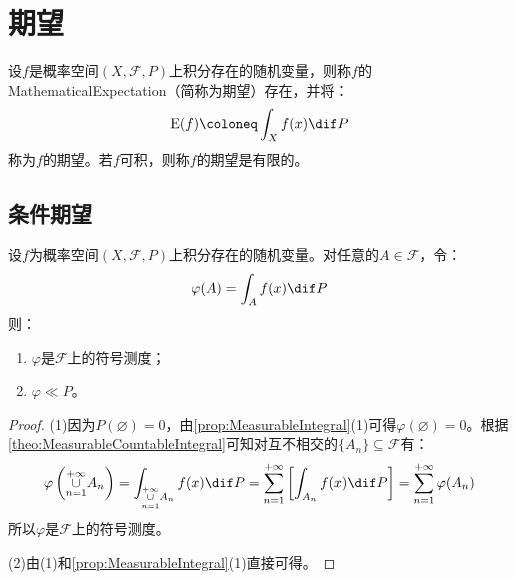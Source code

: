 \section{期望}

\begin{definition}
	设$f$是概率空间$(X,\mathscr{F},P)$上积分存在的随机变量，则称$f$的\gls{MathematicalExpectation}（简称为期望）存在，并将：
	\begin{equation*}
		\operatorname{E}(f)\coloneq\int_{X}f(x)\dif P
	\end{equation*}
	称为$f$的期望。若$f$可积，则称$f$的期望是有限的。
\end{definition}

\subsection{条件期望}
\begin{lemma}\label{lem:ConditionalExpectation}
	设$f$为概率空间$(X,\mathscr{F},P)$上积分存在的随机变量。对任意的$A\in\mathscr{F}$，令：
	\begin{equation*}
		\varphi(A)=\int_{A}f(x)\dif P
	\end{equation*}
	则：
	\begin{enumerate}
		\item $\varphi$是$\mathscr{F}$上的符号测度；
		\item $\varphi\ll P$。
	\end{enumerate}
\end{lemma}
\begin{proof}
	(1)因为$P(\varnothing)=0$，由\cref{prop:MeasurableIntegral}(1)可得$\varphi(\varnothing)=0$。根据\cref{theo:MeasurableCountableIntegral}可知对互不相交的$\{A_n\}\subseteq\mathscr{F}$有：
	\begin{equation*}
		\varphi\left(\underset{n=1}{\overset{+\infty}{\cup}}A_n\right)=\int_{\underset{n=1}{\overset{+\infty}{\cup}}A_n}f(x)\dif P=\sum_{n=1}^{+\infty}\left[\int_{A_n}f(x)\dif P\right]=\sum_{n=1}^{+\infty}\varphi(A_n)
	\end{equation*}
	所以$\varphi$是$\mathscr{F}$上的符号测度。\par
	(2)由(1)和\cref{prop:MeasurableIntegral}(1)直接可得。
\end{proof}
